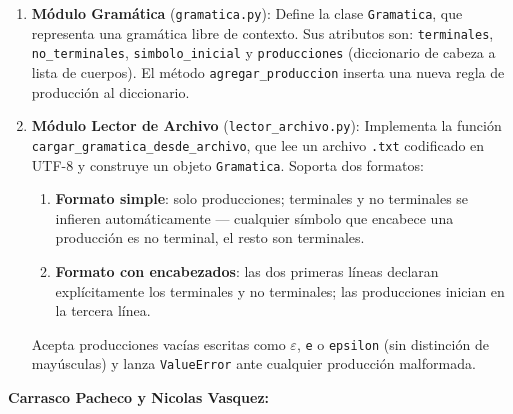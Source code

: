 \begin{enumerate}
  \item \textbf{Módulo Gramática} (\texttt{gramatica.py}): Define la clase \texttt{Gramatica},
    que representa una gramática libre de contexto. Sus atributos son:
    \texttt{terminales}, \texttt{no\_terminales}, \texttt{simbolo\_inicial} y
    \texttt{producciones} (diccionario de cabeza a lista de cuerpos). El método
    \texttt{agregar\_produccion} inserta una nueva regla de producción al diccionario.

  \item \textbf{Módulo Lector de Archivo} (\texttt{lector\_archivo.py}): Implementa la función
    \texttt{cargar\_gramatica\_desde\_archivo}, que lee un archivo \texttt{.txt} codificado en
    UTF-8 y construye un objeto \texttt{Gramatica}. Soporta dos formatos:
    \begin{enumerate}[label=\alph*.]
      \item \textbf{Formato simple}: solo producciones; terminales y no terminales se infieren
        automáticamente — cualquier símbolo que encabece una producción es no terminal, el
        resto son terminales.
      \item \textbf{Formato con encabezados}: las dos primeras líneas declaran explícitamente
        los terminales y no terminales; las producciones inician en la tercera línea.
    \end{enumerate}
    Acepta producciones vacías escritas como $\varepsilon$, \texttt{e} o \texttt{epsilon}
    (sin distinción de mayúsculas) y lanza \texttt{ValueError} ante cualquier producción
    malformada.
\end{enumerate}

\vspace{0.8cm}

\newpage

\textbf{Carrasco Pacheco y Nicolas Vasquez:}

